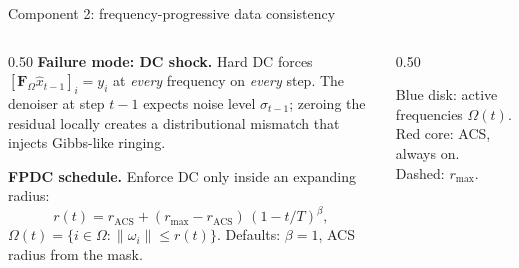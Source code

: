 \documentclass[aspectratio=169]{beamer}
\begin{document}
\begin{frame}{Component 2: frequency-progressive data consistency}
  \small
  \begin{columns}[T]
    \begin{column}{0.50\textwidth}
      \textbf{Failure mode: DC shock.}
      Hard DC forces $[\mathbf{F}_\Omega \hat{x}_{t-1}]_i = y_i$ at \emph{every} frequency on \emph{every} step. The denoiser at step $t{-}1$ expects noise level $\sigma_{t-1}$; zeroing the residual locally creates a distributional mismatch that injects Gibbs-like ringing.

      \vspace{0.4em}
      \textbf{FPDC schedule.} Enforce DC only inside an expanding radius:
      \[
        r(t) = r_{\text{ACS}} + (r_{\max}-r_{\text{ACS}})\,(1-t/T)^\beta,
      \]
      $\Omega(t) = \{i \in \Omega : \|\omega_i\| \leq r(t)\}$.
      Defaults: $\beta = 1$, ACS radius from the mask.
    \end{column}
    \begin{column}{0.50\textwidth}
      \begin{center}
      \end{center}
      \footnotesize
      Blue disk: active frequencies $\Omega(t)$. Red core: ACS, always on. Dashed: $r_{\max}$.
    \end{column}
  \end{columns}
\end{frame}
\end{document}

